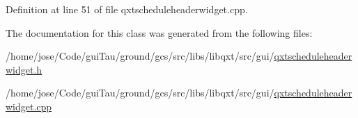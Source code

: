 Definition at line 51 of file qxtscheduleheaderwidget.\-cpp.



The documentation for this class was generated from the following files\-:\begin{DoxyCompactItemize}
\item 
/home/jose/\-Code/gui\-Tau/ground/gcs/src/libs/libqxt/src/gui/\hyperlink{qxtscheduleheaderwidget_8h}{qxtscheduleheaderwidget.\-h}\item 
/home/jose/\-Code/gui\-Tau/ground/gcs/src/libs/libqxt/src/gui/\hyperlink{qxtscheduleheaderwidget_8cpp}{qxtscheduleheaderwidget.\-cpp}\end{DoxyCompactItemize}
